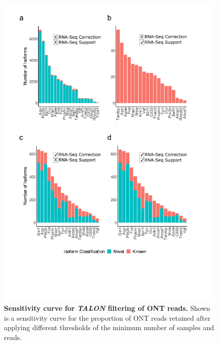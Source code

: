 \begin{figure}[!htp]
	\centering
	\includegraphics[page=3,trim={0cm 13cm 0cm 0cm},clip,scale = 0.55]{Figures/ONTTargetedTranscriptome_BioinformaticsPipeline}
	\captionsetup{width=0.95\textwidth,singlelinecheck=off}
	\caption[Sensitivity curve for \textit{TALON} filtering of ONT reads]%
	{\textbf{Sensitivity curve for \textit{TALON} filtering of ONT reads.} Shown is a sensitivity curve for the proportion of ONT reads retained after applying different thresholds of the minimum number of samples and reads.  
	}
	\label{fig:ONT_sensitivity}
\end{figure}

